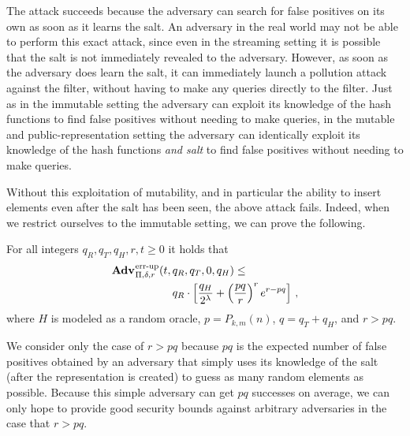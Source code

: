 The attack succeeds because the adversary can search for false positives on its
own as soon as it learns the salt. An adversary in the real world may not be
able to perform this exact attack, since even in the streaming setting it is
possible that the salt is not immediately revealed to the adversary. However, as
soon as the adversary does learn the salt, it can immediately launch a pollution
attack against the filter, without having to make any queries directly to the
filter. Just as in the immutable setting the adversary can exploit its knowledge
of the hash functions to find false positives without needing to make queries,
in the mutable and public-representation setting the adversary can identically
exploit its knowledge of the hash functions \textit{and salt} to find false
positives without needing to make queries.

Without this exploitation of mutability, and in particular the ability to insert
elements even after the salt has been seen, the above attack fails. Indeed, when
we restrict ourselves to the immutable setting, we can prove the following.
%
\begin{theorem}\label{thm:sbf-errep-immutable}
  For all integers $q_R, q_T, q_H, r, t \geq 0$ it holds that
  \begin{equation*}
    \begin{aligned}
            \Adv{\errep}_{\Pi,\delta,r}(t,\,&q_R,q_T,0,q_H) \leq \\
        & q_R \cdot \left[\frac{q_H}{2^\lambda} +
        \left(\frac{pq}{r}\right)^re^{r-pq}\right] \,,
    \end{aligned}
  \end{equation*}
  where $H$ is modeled as a random oracle, $p=P_{k,m}(n)$, $q = q_T + q_H$, and
  $r > pq$.
\end{theorem}
We consider only the case of $r > pq$ because $pq$ is the expected number of
false positives obtained by an adversary that simply uses its knowledge of the
salt (after the representation is created) to guess as many random elements as
possible. Because this simple adversary can get $pq$ successes on average, we
can only hope to provide good security bounds against arbitrary adversaries in
the case that $r > pq$.

